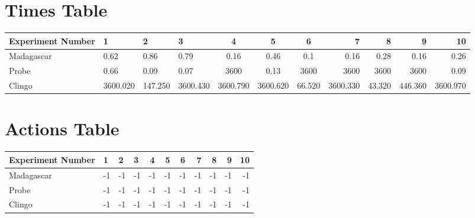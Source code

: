 \documentclass[8pt]{article}
\begin{document}
\begin{landscape}
\section{Times Table}\begin{tabular}{ | l | l | l | l | c | c | c | r | r | r | r | }\hline
Experiment Number & 1 & 2 & 3 & 4 & 5 & 6 & 7 & 8 & 9 & 10\\  \hline
Madagascar & 0.62 & 0.86 & 0.79 & 0.16 & 0.46 & 0.1 & 0.16 & 0.28 & 0.16 & 0.26\\  \hline
Probe & 0.66 & 0.09 & 0.07 & 3600 & 0.13 & 3600 & 3600 & 3600 & 3600 & 0.09\\  \hline
Clingo & 3600.020 & 147.250 & 3600.430 & 3600.790 & 3600.620 & 66.520 & 3600.330 & 43.320 & 446.360 & 3600.970\\ \hline
\end{tabular}
\section{Actions Table}\begin{tabular}{ | l | l | l | l | c | c | c | r | r | r | r | }\hline
Experiment Number & 1 & 2 & 3 & 4 & 5 & 6 & 7 & 8 & 9 & 10\\ \hline
 Madagascar & -1 & -1 & -1 & -1 & -1 & -1 & -1 & -1 & -1 & -1\\ \hline
 Probe & -1 & -1 & -1 & -1 & -1 & -1 & -1 & -1 & -1 & -1\\ \hline
 Clingo & -1 & -1 & -1 & -1 & -1 & -1 & -1 & -1 & -1 & -1\\ \hline
\end{tabular}
\end{landscape}
\end{document}
